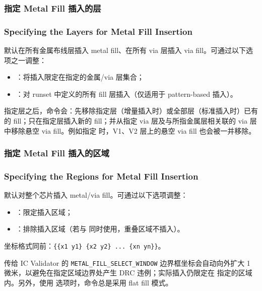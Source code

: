 \subsubsection{指定 Metal Fill 插入的层}
\subsubsection*{Specifying the Layers for Metal Fill Insertion}

默认在所有金属布线层插入 metal fill、在所有 via 层插入 via fill。可通过以下选项之一调整：
\begin{itemize}
  \item {}：将插入限定在指定的金属/via 层集合；
  \item {}：对 runset 中定义的所有 fill 层插入（仅适用于 pattern-based 插入）。
\end{itemize}

指定层之后，命令会：先移除指定层（增量插入时）或全部层（标准插入时）已有的 fill；只在指定层插入新的 fill；并从指定 via 层及与所指金属层相关联的 via 层中移除悬空 via fill。例如指定  时，V1、V2 层上的悬空 via fill 也会被一并移除。

\subsubsection{指定 Metal Fill 插入的区域}
\subsubsection*{Specifying the Regions for Metal Fill Insertion}

默认对整个芯片插入 metal/via fill。可通过以下选项调整：
\begin{itemize}
  \item {}：限定插入区域；
  \item {}：排除插入区域（若与  同时使用，重叠区域不插入）。
\end{itemize}
坐标格式同前：\texttt{\{\{x1 y1\} \{x2 y2\} ... \{xn yn\}\}}。

\begin{noteBox}
传给 IC Validator 的 \texttt{METAL\_FILL\_SELECT\_WINDOW} 边界框坐标会自动向外扩大 1 微米，以避免在指定区域边界处产生 DRC 违例；实际插入仍限定在  指定的区域内。另外，使用  选项时，命令总是采用 flat fill 模式。
\end{noteBox}

